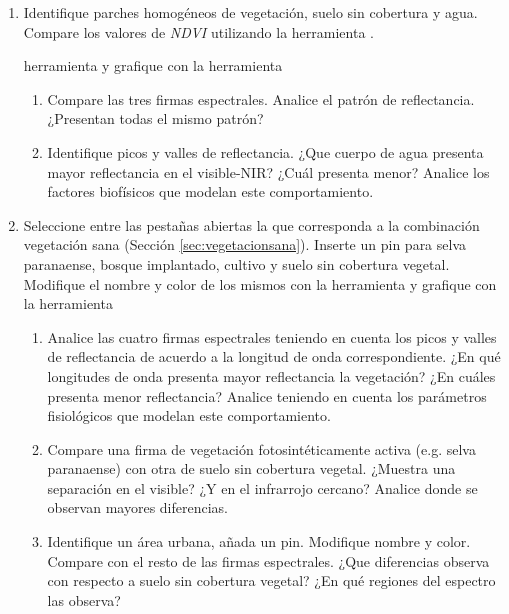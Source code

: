 \begin{enumerate}
  \item Identifique parches homogéneos de vegetación, suelo sin cobertura y agua. Compare los valores de \emph{NDVI} utilizando la herramienta .
  
  
   herramienta  y grafique con la herramienta 
\begin{enumerate}
    \item Compare las tres firmas espectrales. Analice el patrón de reflectancia. ¿Presentan todas el mismo patrón?
    \item Identifique picos y valles de reflectancia. ¿Que cuerpo de agua presenta mayor reflectancia en el visible-NIR? ¿Cuál presenta menor? Analice los factores biofísicos que modelan este comportamiento.

  \end{enumerate}

  \item Seleccione entre las pestañas abiertas la que corresponda a la combinación vegetación sana (Sección \ref{sec:vegetacionsana}). Inserte un pin para selva paranaense, bosque implantado, cultivo y suelo sin cobertura vegetal. Modifique el nombre y color de los mismos con la herramienta  y grafique con la herramienta 
  \begin{enumerate}
    \item Analice las cuatro firmas espectrales teniendo en cuenta los picos y valles de reflectancia de acuerdo a la longitud de onda correspondiente. ¿En qué longitudes de onda presenta mayor reflectancia la vegetación? ¿En cuáles presenta menor reflectancia? Analice teniendo en cuenta los parámetros fisiológicos que modelan este comportamiento.
    \item Compare una firma de vegetación fotosintéticamente activa (e.g. selva paranaense) con otra de suelo sin cobertura vegetal. ¿Muestra una separación en el visible? ¿Y en el infrarrojo cercano? Analice donde se observan mayores diferencias.
	\item Identifique un área urbana, añada un pin. Modifique nombre y color. Compare con el resto de las firmas espectrales. ¿Que diferencias observa con respecto a suelo sin cobertura vegetal? ¿En qué regiones del espectro las observa? 
  \end{enumerate}
 \end{enumerate}
 